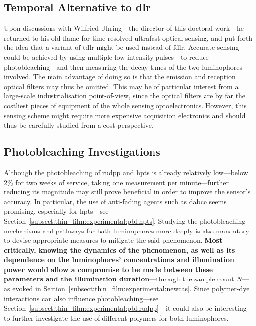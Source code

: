 \subsection{Temporal Alternative to \texorpdfstring{\gls{dlr}}{DLR}}

Upon discussions with Wilfried Uhring---the director of this doctoral work---he returned to his old flame for time-resolved ultrafast optical sensing, and put forth the idea that a variant of \gls{tdlr} might be used instead of \gls{fdlr}. Accurate sensing could be achieved by using multiple low intensity pulses---to reduce photobleaching---and then measuring the decay times of the two luminophores involved. The main advantage of doing so is that the emission and reception optical filters may thus be omitted. This may be of particular interest from a large-scale industrialisation point-of-view, since the optical filters are by far the costliest pieces of equipment of the whole sensing optoelectronics. However, this sensing scheme might require more expensive acquisition electronics and should thus be carefully studied from a cost perspective.

\subsection{Photobleaching Investigations}\label{sect:conclusion:photobleaching}

Although the photobleaching of \gls{rudpp} and \gls{hpts} is already relatively low---below 2\% for two weeks of service, taking one measurement per minute---further reducing its magnitude may still prove beneficial in order to improve the sensor's accuracy. In particular, the use of anti-fading agents such as \gls{dabco} seems promising, especially for \gls{hpts}---see Section~\ref{subsect:thin_film:experimental:pbl:hpts}. Studying the photobleaching mechanisms and pathways for both luminophores more deeply is also mandatory to devise appropriate measures to mitigate the said phenomenon. \textbf{Most critically, knowing the dynamics of the phenomenon, as well as its dependence on the luminophores' concentrations and illumination power would allow a compromise to be made between these parameters and the illumination duration}---through the sample count $N$---as evoked in Section~\ref{subsect:thin_film:experimental:newcas}. Since polymer-dye interactions can also influence photobleaching---see Section~\ref{subsect:thin_film:experimental:pbl:rudpp}---it could also be interesting to further investigate the use of different polymers for both luminophores.

